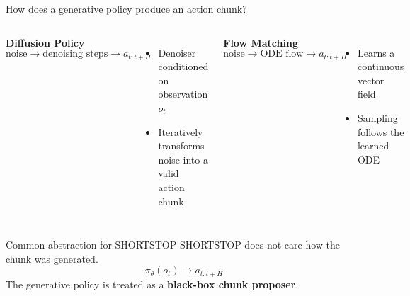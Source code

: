 \documentclass[aspectratio=169]{beamer}
\begin{document}
\begin{frame}[t,shrink=8]{How does a generative policy produce an action chunk?}
\begin{columns}[T]

\textbf{Diffusion Policy}
\[
\text{noise}
\rightarrow
\text{denoising steps}
\rightarrow
a_{t:t+H}
\]
\begin{itemize}
    \item Denoiser conditioned on observation $o_t$
    \item Iteratively transforms noise into a valid action chunk
\end{itemize}

\textbf{Flow Matching}
\[
\text{noise}
\rightarrow
\text{ODE flow}
\rightarrow
a_{t:t+H}
\]
\begin{itemize}
    \item Learns a continuous vector field
    \item Sampling follows the learned ODE
\end{itemize}

\end{columns}
\vspace{7pt}

\begin{alertblock}{Common abstraction for SHORTSTOP}
SHORTSTOP does not care how the chunk was generated.
\[
\boxed{
\pi_\theta(o_t)
\rightarrow
a_{t:t+H}
}
\]
The generative policy is treated as a \textbf{black-box chunk proposer}.
\end{alertblock}
\end{frame}

\end{document}
